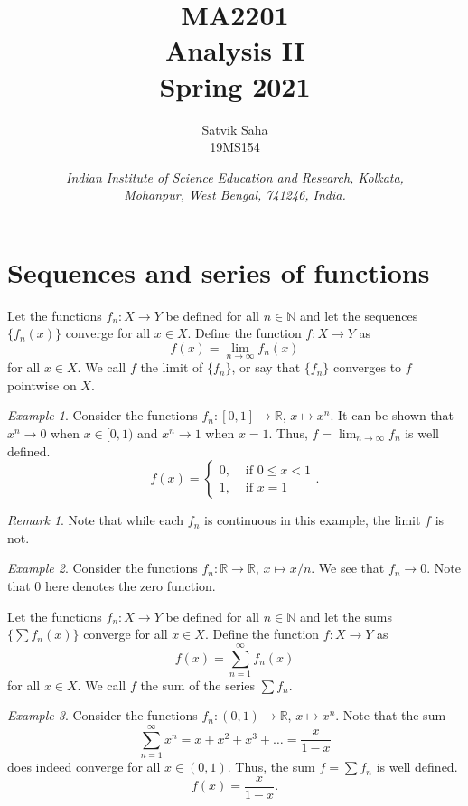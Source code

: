 \documentclass[11pt]{article}
\title{
    \Large\textsc{MA2201} \\
    \Huge \textbf{Analysis II} \\
    \vspace{5pt}
    \Large{Spring 2021}
}
\author{
    \large Satvik Saha%
    \\\textsc{\small 19MS154}
}
\date{\normalsize
    \textit{Indian Institute of Science Education and Research, Kolkata, \\
    Mohanpur, West Bengal, 741246, India.} \\
}
\def\R{\mathbb{R}}
\theoremstyle{definition}
\theoremstyle{remark}
\newtheorem*{remark}{Remark}
\newtheorem*{example}{Example}
\numberwithin{equation}{section}
\begin{document}
    \maketitle

    \section{Sequences and series of functions}
    \begin{definition}
        Let the functions $f_n\colon X \to Y$ be defined for all $n \in \mathbb{N}$
        and let the sequences $\{f_n(x)\}$ converge for all $x \in X$. Define the
        function $f\colon X \to Y$ as \[
            f(x) = \lim_{n \to \infty} f_n(x) 
        \] for all $x \in X$. We call $f$ the limit of $\{f_n\}$, or say that
        $\{f_n\}$ converges to $f$ pointwise on $X$.
    \end{definition}
    \begin{example}
        Consider the functions $f_n\colon [0, 1] \to \R$, $x \mapsto x^n$.
        It can be shown that $x^n \to 0$ when $x \in [0, 1)$ and 
        $x^n \to 1$ when $x = 1$. Thus, $f = \lim_{n \to \infty} f_n$ is well
        defined. \[
            f(x) = \begin{cases}
                0, &\text{ if } 0 \leq x < 1 \\
                1, &\text{ if } x = 1
            \end{cases}.
        \] 
    \end{example}
    \begin{remark}
        Note that while each $f_n$ is continuous in this example, the limit $f$
        is not.
    \end{remark}
    \begin{example}
        Consider the functions $f_n\colon \R \to \R$, $x \mapsto x/n$.
        We see that $f_n \to 0$. Note that $0$ here denotes the zero function.
    \end{example}
    
    \begin{definition}
        Let the functions $f_n\colon X \to Y$ be defined for all $n \in \mathbb{N}$
        and let the sums $\{\sum f_n(x)\}$ converge for all $x \in X$.
        Define the function $f\colon X \to Y$ as \[
            f(x) = \sum_{n = 1}^\infty f_n(x)
        \] for all $x \in X$. We call $f$ the sum of the series $\sum f_n$.
    \end{definition}
    \begin{example}
        Consider the functions $f_n\colon (0, 1) \to \R$, $x \mapsto x^n$.
        Note that the sum \[
            \sum_{n = 1}^{\infty} x^n = x + x^2 + x^3 + \dots 
                = \frac{x}{1 - x} 
        \] does indeed converge for all $x \in (0, 1)$. Thus, the sum $f = \sum f_n$
        is well defined. \[
            f(x) = \frac{x}{1 - x}.
        \] 
    \end{example}
\end{document}
